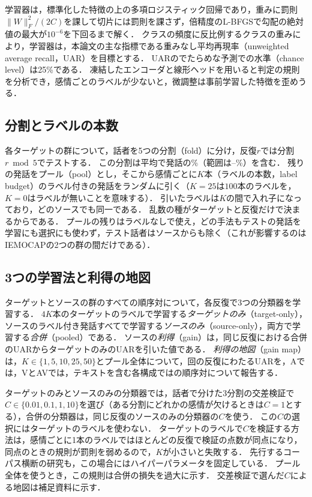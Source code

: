 学習器は，標準化した特徴の上の多項ロジスティック回帰であり，重みに罰則$\|W\|_F^2/(2C)$を課して切片には罰則を課さず，倍精度のL-BFGS\cite{liu1989lbfgs}で勾配の絶対値の最大が$10^{-6}$を下回るまで解く．
クラスの頻度に反比例するクラスの重みにより，学習器は，本論文の主な指標である重みなし平均再現率（unweighted average recall，UAR）を目標とする．
UARのでたらめな予測での水準（chance level）は25\%である．
凍結したエンコーダと線形ヘッドを用いると判定の規則を分析でき，感情ごとのラベルが少ないと，微調整は事前学習した特徴を歪めうる\cite{kumar2022lpft}．

\subsection{分割とラベルの本数}
\label{sec:setting-splits}

各ターゲットの群について，話者を5つの分割（fold）に分け，反復$r$では分割$r \bmod 5$でテストする．
この分割は平均で発話の\%（範囲は--\%）を含む．
残りの発話をプール（pool）とし，そこから感情ごとに$K$本（ラベルの本数，label budget）のラベル付きの発話をランダムに引く（$K=25$は$100$本のラベルを，$K=0$はラベルが無いことを意味する）．
引いたラベルは$K$の間で入れ子になっており，どのソースでも同一である．
乱数の種がターゲットと反復だけで決まるからである．
プールの残りはラベルなしで使え，どの手法もテストの発話を学習にも選択にも使わず，テスト話者はソースからも除く（これが影響するのはIEMOCAPの2つの群の間だけである）．

\subsection{3つの学習法と利得の地図}
\label{sec:setting-map}

ターゲットとソースの群のすべての順序対について，各反復で3つの分類器を学習する．
$4K$本のターゲットのラベルで学習する\emph{ターゲットのみ}（target-only），ソースのラベル付き発話すべてで学習する\emph{ソースのみ}（source-only），両方で学習する\emph{合併}（pooled）である．
ソースの\emph{利得}（gain）は，同じ反復における合併のUARからターゲットのみのUARを引いた値である．
\emph{利得の地図}（gain map）は，$K \in \{1, 5, 10, 25, 50\}$とプール全体について，回の反復にわたるUARを，Aでは，VとAVでは，テキストを含む各構成ではの順序対について報告する．

ターゲットのみとソースのみの分類器では，話者で分けた3分割の交差検証で$C \in \{0.01, 0.1, 1, 10\}$を選び（ある分割にどれかの感情が欠けるときは$C=1$とする），合併の分類器は，同じ反復のソースのみの分類器の$C$を使う．
この$C$の選択にはターゲットのラベルを使わない．
ターゲットのラベルで$C$を検証する方法は，感情ごとに1本のラベルではほとんどの反復で検証の点数が同点になり，同点のときの規則が罰則を弱めるので，$K$が小さいと失敗する．
先行するコーパス横断の研究も，この場合にはハイパーパラメータを固定している\cite{gideon2021addog}．
プール全体を使うとき，この規則は合併の損失を過大に示す．
交差検証で選んだ$C$による地図は補足資料に示す．

